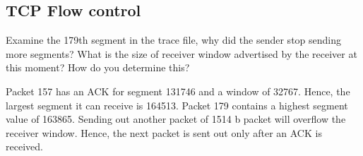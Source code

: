 \subsection{TCP Flow control}
\begin{Question}
	Examine the 179th segment in the trace file, why did the sender stop sending more segments? What is the size of receiver window advertised by the receiver at this moment? How do you determine this?
\end{Question}
\begin{Answer}
	Packet 157 has an ACK for segment 131746 and a window of 32767. Hence, the largest segment it can receive is 164513. Packet 179 contains a highest segment value of 163865. Sending out another packet of 1514 b packet will overflow the receiver window. Hence, the next packet is sent out only after an ACK is received.
\end{Answer}
